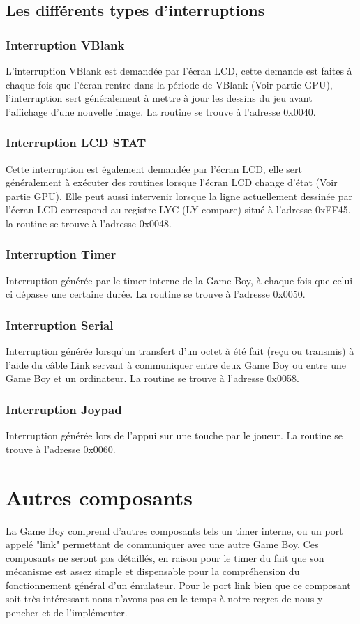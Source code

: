\documentclass{report}
\begin{document}
\subsection{Les différents types d'interruptions}
\subsubsection{Interruption VBlank}
L'interruption VBlank est demandée par l'écran LCD, cette demande est faites à chaque fois que l'écran rentre dans la période de VBlank (Voir partie GPU), l'interruption sert généralement à mettre à jour les dessins du jeu avant l'affichage d'une nouvelle image. La routine se trouve à l'adresse 0x0040.
\subsubsection{Interruption LCD STAT}
Cette interruption est également demandée par l'écran LCD, elle sert généralement à exécuter des routines lorsque l'écran LCD change d'état (Voir partie GPU). Elle peut aussi intervenir lorsque la ligne actuellement dessinée par l'écran LCD correspond au registre LYC (LY compare) situé à l'adresse 0xFF45. la routine se trouve à l'adresse 0x0048.
\subsubsection{Interruption Timer}
Interruption générée par le timer interne de la Game Boy, à chaque fois que celui ci dépasse une certaine durée. La routine se trouve à l'adresse 0x0050.
\subsubsection{Interruption Serial}
Interruption générée lorsqu'un transfert d'un octet à été fait (reçu ou transmis) à l'aide du câble Link servant à communiquer entre deux Game Boy ou entre une Game Boy et un ordinateur. La routine se trouve à l'adresse 0x0058.
\subsubsection{Interruption Joypad}
Interruption générée lors de l'appui sur une touche par le joueur. La routine se trouve à l'adresse 0x0060.
\section{Autres composants}
La Game Boy comprend d'autres composants tels un timer interne, ou un port appelé "link" permettant de communiquer avec une autre Game Boy. Ces composants ne seront pas détaillés, en raison pour le timer du fait que son mécanisme est assez simple et dispensable pour la compréhension du fonctionnement général d'un émulateur. Pour le port link bien que ce composant soit très intéressant nous n'avons pas eu le temps à notre regret de nous y pencher et de l'implémenter.
\end{document}
